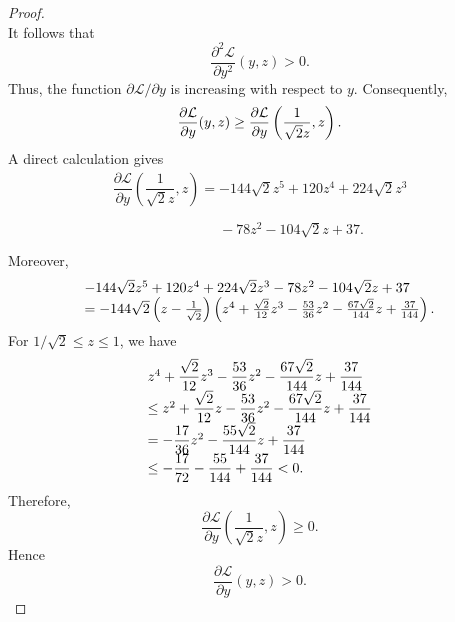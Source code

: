 \documentclass[11pt,a4paper]{article}
\numberwithin{equation}{section}
\numberwithin{table}{section}
\theoremstyle{plain}
\theoremstyle{definition}\newtheorem{definition}[theorem]{Definition}
\theoremstyle{remark}\newtheorem{remark}[theorem]{Remark}
\begin{document}
\begin{proof}
\begin{equation*}
\end{equation*}
It follows that 
\begin{equation*}
\frac{\partial^2 \mathcal{L}}{\partial y^2}(y,z)>0.
\end{equation*}
Thus, the function $\partial \mathcal{L}/\partial y$ is increasing
with respect to $y$. Consequently, 
\begin{equation*}
\frac{\partial \mathcal{L}}{\partial y}(y,z)\geq \frac{\partial \mathcal{L}}{%
\partial y}\left(\frac1{\sqrt2 z},z\right).
\end{equation*}
A direct calculation gives 
\begin{equation*}
\begin{array}{l}
\dfrac{\partial \mathcal{L}}{\partial y}\left(\dfrac1{\sqrt2
z},z\right)=-144\sqrt2 z^5+120z^4+224\sqrt2 z^3 \\ 
\phantom{\dfrac{\partial \mathcal L}{\partial y}\left(\dfrac1{\sqrt2
z},z\right)=}{}-78z^2-104\sqrt2 z+37.%
\end{array}%
\end{equation*}
Moreover, 
\begin{equation*}
\begin{array}{l}
-144\sqrt2 z^5+120z^4+224\sqrt2 z^3-78z^2-104\sqrt2 z+37 \\ 
=-144\sqrt2\left(z-\frac1{\sqrt2}\right)\left(z^4+\frac{\sqrt2}{12}z^3-\frac{%
53}{36}z^2-\frac{67\sqrt2}{144}z+\frac{37}{144}\right).%
\end{array}%
\end{equation*}
For $1/\sqrt2\leq z\leq1$, we have 
\begin{equation*}
\begin{array}{l}
z^4+\dfrac{\sqrt2}{12}z^3-\dfrac{53}{36}z^2-\dfrac{67\sqrt2}{144}z+\dfrac{37%
}{144} \\ 
\leq z^2+\dfrac{\sqrt2}{12}z-\dfrac{53}{36}z^2-\dfrac{67\sqrt2}{144}z+\dfrac{%
37}{144} \\ 
=-\dfrac{17}{36}z^2-\dfrac{55\sqrt2}{144}z+\dfrac{37}{144} \\ 
\leq -\dfrac{17}{72}-\dfrac{55}{144}+\dfrac{37}{144}<0.%
\end{array}%
\end{equation*}
Therefore, 
\begin{equation*}
\frac{\partial \mathcal{L}}{\partial y}\left(\frac1{\sqrt2 z},z\right)\geq0.
\end{equation*}
Hence 
\begin{equation*}
\frac{\partial \mathcal{L}}{\partial y}(y,z)>0.
\end{equation*}

\end{proof}
\end{document}
